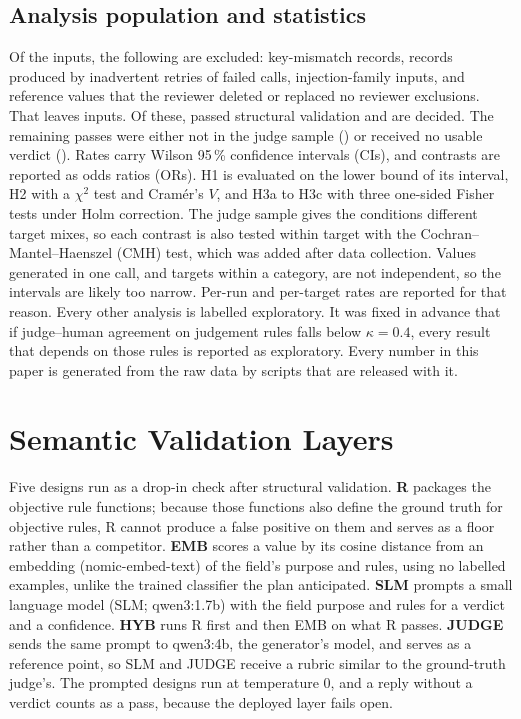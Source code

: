 \documentclass[conference]{IEEEtran}
\begin{document}
\subsection{Analysis population and statistics}
Of the  inputs, the following are excluded:  key-mismatch records,
 records produced by inadvertent retries of failed calls,  injection-family
inputs, and\ifreviewed{}  reference values that the reviewer deleted or
replaced\else{} no reviewer exclusions\fi. That leaves  inputs. Of these, 
passed structural validation and  are decided. The remaining passes were either not in
the judge sample () or received no usable verdict
(). Rates carry Wilson 95\,\% confidence intervals (CIs), and contrasts are
reported as odds ratios (ORs). H1 is evaluated on the lower bound of its interval, H2 with a $\chi^2$
test and Cram\'er's $V$, and H3a to H3c with three one-sided Fisher tests under Holm correction. The
judge sample gives the conditions different target mixes, so each contrast is also tested within target
with the Cochran--Mantel--Haenszel (CMH) test, which was added after data collection. Values generated
in one call, and targets within a category, are not independent, so the intervals are likely too
narrow. Per-run and per-target rates are reported for that reason. Every other analysis is labelled
exploratory. It was fixed in advance that if judge--human agreement on judgement rules falls below
$\kappa=0.4$, every result that depends on those rules is reported as exploratory. Every number in this
paper is generated from the raw data by scripts that are released with it.

\section{Semantic Validation Layers}
\label{sec:layer}

Five designs run as a drop-in check after structural validation. \textbf{R} packages the objective
rule functions; because those functions also define the ground truth for objective rules, R cannot
produce a false positive on them and serves as a floor rather than a competitor. \textbf{EMB} scores a
value by its cosine distance from an embedding (nomic-embed-text) of the field's purpose and rules,
using no labelled examples, unlike the trained classifier the plan anticipated. \textbf{SLM} prompts a
small language model (SLM; qwen3:1.7b) with the field purpose and rules for a verdict and a confidence.
\textbf{HYB} runs R first and then EMB on what R passes. \textbf{JUDGE} sends the same prompt to
qwen3:4b, the generator's model, and serves as a reference point, so SLM and JUDGE receive a rubric
similar to the ground-truth judge's. The prompted designs run at temperature 0, and a reply without a
verdict counts as a pass, because the deployed layer fails open.
\end{document}
